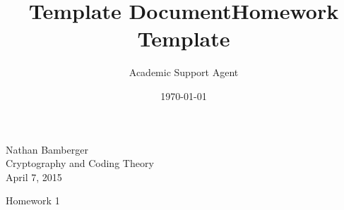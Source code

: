 \documentclass{article}
\title{Template Document}
\author{Academic Support Agent}
\date{\today}
\begin{document}
\maketitle

\def\bs{\textbackslash}
\setlength\parindent{0pt}
\def\reals{\hbox{\rm I\kern-.18em R}}
\def\complexes{\hbox{\rm C\kern-.43em
\vrule depth 0ex height 1.4ex width .05em\kern.41em}}
\def\field{\hbox{\rm I\kern-.18em F}} %
\title{Homework Template}
\setcounter{page}{1}
\begin{flushright}
Nathan Bamberger \\
Cryptography and Coding Theory \\
April 7, 2015
\end{flushright}
\begin{center}
Homework 1
\end{center}
\vspace{1ex}
\end{document}
